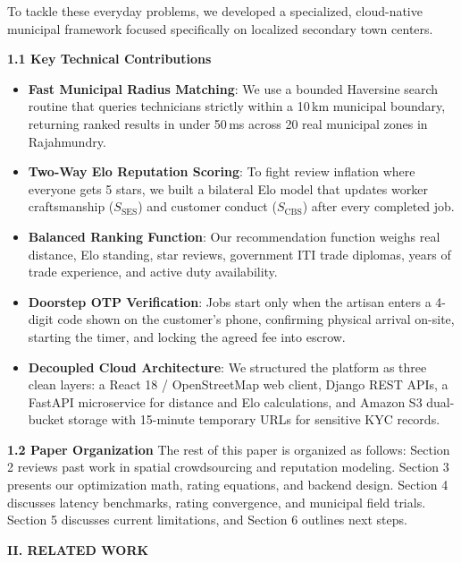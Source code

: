 \documentclass[10pt,twocolumn,a4paper]{article}
\begin{document}
To tackle these everyday problems, we developed a specialized, cloud-native municipal framework focused specifically on localized secondary town centers.

\vspace{0.8em}
\noindent
\textbf{1.1 Key Technical Contributions}
\begin{itemize}
    \item \textbf{Fast Municipal Radius Matching}: We use a bounded Haversine search routine that queries technicians strictly within a 10\,km municipal boundary, returning ranked results in under 50\,ms across 20 real municipal zones in Rajahmundry.
    \item \textbf{Two-Way Elo Reputation Scoring}: To fight review inflation where everyone gets 5 stars, we built a bilateral Elo model that updates worker craftsmanship ($S_{\text{SES}}$) and customer conduct ($S_{\text{CBS}}$) after every completed job.
    \item \textbf{Balanced Ranking Function}: Our recommendation function weighs real distance, Elo standing, star reviews, government ITI trade diplomas, years of trade experience, and active duty availability.
    \item \textbf{Doorstep OTP Verification}: Jobs start only when the artisan enters a 4-digit code shown on the customer's phone, confirming physical arrival on-site, starting the timer, and locking the agreed fee into escrow.
    \item \textbf{Decoupled Cloud Architecture}: We structured the platform as three clean layers: a React 18 / OpenStreetMap web client, Django REST APIs, a FastAPI microservice for distance and Elo calculations, and Amazon S3 dual-bucket storage with 15-minute temporary URLs for sensitive KYC records.
\end{itemize}

\vspace{0.8em}
\noindent
\textbf{1.2 Paper Organization}
The rest of this paper is organized as follows: Section 2 reviews past work in spatial crowdsourcing and reputation modeling. Section 3 presents our optimization math, rating equations, and backend design. Section 4 discusses latency benchmarks, rating convergence, and municipal field trials. Section 5 discusses current limitations, and Section 6 outlines next steps.

\vspace{1.2em}
\noindent
\textbf{\large II. RELATED WORK}
\end{document}
